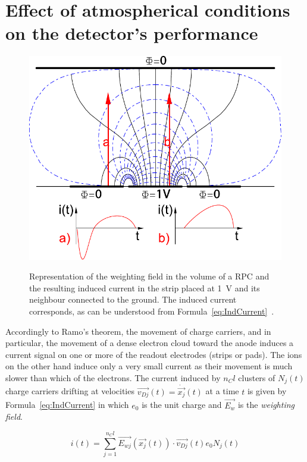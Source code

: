 \section{Effect of atmospherical conditions on the detector's performance}
\label{chapt4:sec:PTcorrection}
	
	\begin{figure}[H]
		\centering
		\includegraphics[width = 0.7\plotwidth]{fig/chapt4/Weighting_field.pdf}\\
		\caption{\label{fig:weighting-field} Representation of the weighting field in the volume of a RPC and the resulting induced current in the strip placed at \SI{1}{V} and its neighbour connected to the ground. The induced current corresponds, as can be understood from Formula~\ref{eq:IndCurrent}~\cite{LIPPMANN2003}.}
	\end{figure}

	Accordingly to Ramo's theorem, the movement of charge carriers, and in particular, the movement of a dense electron cloud toward the anode induces a current signal on one or more of the readout electrodes (strips or pads). The ions on the other hand induce only a very small current as their movement is much slower than which of the electrons. The current induced by $n_Cl$ clusters of $N_j(t)$ charge carriers drifting at velocities $\overrightarrow{v_{Dj}}(t) = \dot{\overrightarrow{x_j}}(t)$ at a time $t$ is given by Formula~\ref{eq:IndCurrent} in which $e_0$ is the unit charge and $\overrightarrow{E_w}$ is the \textit{weighting field}.
	
	\begin{equation}
	\label{eq:IndCurrent}
	i(t) = \sum_{j=1}^{n_Cl} \overrightarrow{E_{wj}}(\overrightarrow{x_j}(t)) \cdot \overrightarrow{v_{Dj}}(t) e_0 N_j(t)
	\end{equation}
	
